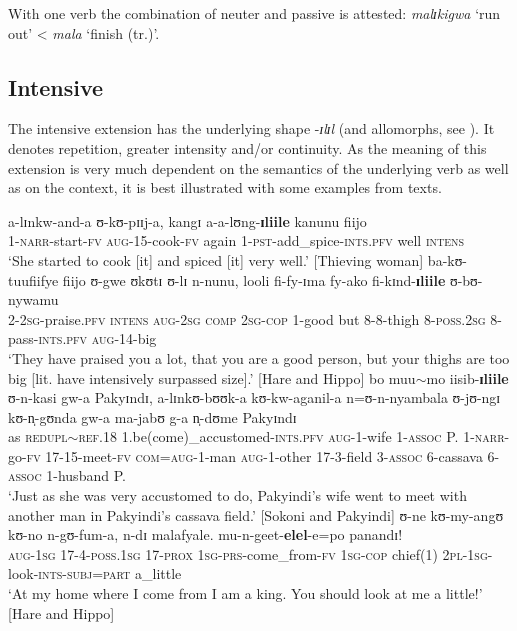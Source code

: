 With one verb the combination of neuter and passive is attested: \textit{malɪkigwa} \lq run out' < \textit{mala} \lq finish (tr.)'.%
\subsection{Intensive}
The intensive extension has the underlying shape -\textit{ɪlɪl} (and allomorphs, see ). It denotes repetition, greater intensity and/or continuity. As the meaning of this extension is very much dependent on the semantics of the underlying verb as well as on the context, it is best illustrated with some examples from texts.

\begin{exe}
\ex \gll a-lɪnkw-and-a ʊ-kʊ-pɪɪj-a, kangɪ a-a-lʊng-\textbf{ɪliile} kanunu fiijo\\
1-\textsc{narr}-start-\textsc{fv} \textsc{aug}-15-cook-\textsc{fv} again 1-\textsc{pst}-add\_spice-\textsc{ints.pfv} well \textsc{intens}\\
\glt `She started to cook [it] and spiced [it] very well.' [Thieving woman]
\ex \gll ba-kʊ-tuufiifye fiijo ʊ-gwe ʊkʊtɪ ʊ-lɪ n-nunu, looli fi-fy-ɪma fy-ako fi-kɪnd-\textbf{ɪliile} ʊ-bʊ-nywamu\\
2-\textsc{2sg}-praise.\textsc{pfv} \textsc{intens} \textsc{aug}-\textsc{2sg} \textsc{comp} \textsc{2sg}-\textsc{cop} 1-good but 8-8-thigh 8-\textsc{poss.2sg} 8-pass-\textsc{ints}.\textsc{pfv} \textsc{aug}-14-big\\
\glt `They have praised you a lot, that you are a good person, but your thighs are too big [lit. have intensively surpassed size].' [Hare and Hippo] %
\ex \gll bo muu$\sim$mo iisib-\textbf{ɪliile} ʊ-n-kasi gw-a Pakyɪndɪ, a-lɪnkʊ-bʊʊk-a kʊ-kw-aganil-a n=ʊ-n-nyambala ʊ-jʊ-ngɪ kʊ-n̩-gʊnda gw-a ma-jabʊ g-a n̩-dʊme Pakyɪndɪ\\
as \textsc{redupl}$\sim$\textsc{ref.18} 1.be(come)\_accustomed-\textsc{ints.pfv} \textsc{aug}-1-wife 1-\textsc{assoc} P. 1-\textsc{narr}-go-\textsc{fv} 17-15-meet-\textsc{fv} \textsc{com}=\textsc{aug}-1-man \textsc{aug}-1-other 17-3-field 3-\textsc{assoc} 6-cassava 6-\textsc{assoc} 1-husband P.\\
\glt `Just as she was very accustomed to do, Pakyindi's wife went to meet with another man in Pakyindi's cassava field.' [Sokoni and Pakyindi] 
\ex \gll ʊ-ne kʊ-my-angʊ kʊ-no n-gʊ-fum-a, n-dɪ malafyale. mu-n-geet-\textbf{elel}-e=po panandɪ!\\
\textsc{aug}-\textsc{1sg} 17-4-\textsc{poss.1sg} 17-\textsc{prox} \textsc{1sg}-\textsc{prs}-come\_from-\textsc{fv} \textsc{1sg}-\textsc{cop} chief(1) \textsc{2pl}-\textsc{1sg}-look-\textsc{ints}-\textsc{subj}=\textsc{part} a\_little\\ 
\glt `At my home where I come from I am a king. You should look at me a little!' [Hare and Hippo]
\end{exe}


